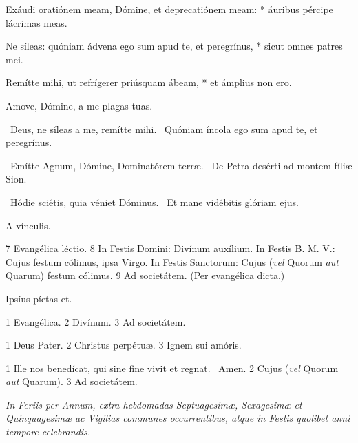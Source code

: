 Exáudi oratiónem meam, Dómine, et deprecatiónem meam: * áuribus pércipe lácrimas meas.

Ne síleas: quóniam ádvena ego sum apud te, et peregrínus, * sicut omnes patres mei.

Remítte mihi, ut refrígerer priúsquam ábeam, * et ámplius non ero.

 Amove, Dómine, a me plagas tuas.


\V\ Deus, ne síleas a me, remítte mihi. \R\ Quóniam íncola ego sum apud te, et peregrínus.


\V\ Emítte Agnum, Dómine, Dominatórem terræ. \R\ De Petra desérti ad montem fíliæ Sion.


\V\ Hódie sciétis, quia véniet Dóminus. \R\ Et mane vidébitis glóriam ejus.


 A vínculis.

 7 Evangélica léctio. 8 In Festis Domini: Divínum auxílium. In Festis B. M. V.: Cujus festum cólimus, ipsa Virgo. In Festis Sanctorum: Cujus (\textit{vel} Quorum \textit{aut} Quarum) festum cólimus. 9 Ad societátem. (Per evangélica dicta.)


 Ipsíus píetas et.


 1 Evangélica. 2 Divínum. 3 Ad societátem.


 1 Deus Pater. 2 Christus perpétuæ. 3 Ignem sui amóris.


 1 Ille nos benedícat, qui sine fine vivit et regnat. \R\ Amen. 2 Cujus (\textit{vel} Quorum \textit{aut} Quarum). 3 Ad societátem.

\sectionornament


\textit{In Feriis per Annum, extra hebdomadas Septuagesimæ, Sexagesimæ et Quinquagesimæ ac Vigilias communes occurrentibus, atque in Festis quolibet anni tempore celebrandis.}

